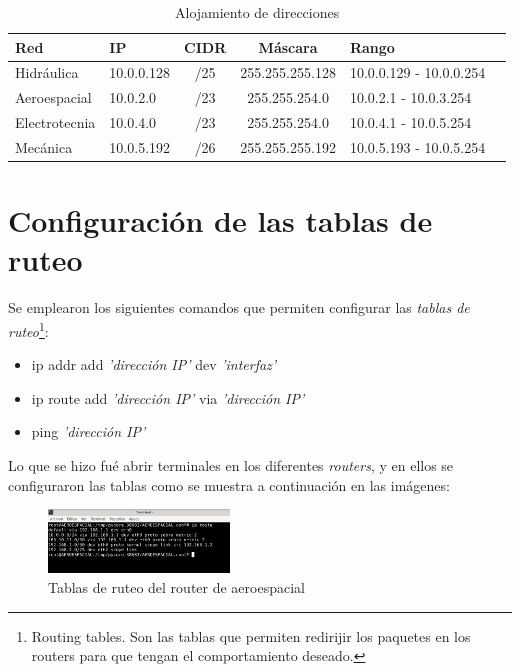 \documentclass[letterpaper, 10 pt, conference]{ieeeconf}  %
\begin{document}
\begin{table}[H]
	\centering
	\begin{tabular}{|l|l|c|c|l|l|}
		\hline
		\textbf{Red}  & \textbf{IP} & \textbf{CIDR} & \textbf{Máscara} & \textbf{Rango}          \\ \hline
		Hidráulica    & 10.0.0.128  & /25           & 255.255.255.128  & 10.0.0.129 - 10.0.0.254 \\ \hline
		Aeroespacial  & 10.0.2.0    & /23           & 255.255.254.0    & 10.0.2.1 - 10.0.3.254   \\ \hline
		Electrotecnia & 10.0.4.0    & /23           & 255.255.254.0    & 10.0.4.1 - 10.0.5.254   \\ \hline
		Mecánica      & 10.0.5.192  & /26           & 255.255.255.192  & 10.0.5.193 - 10.0.5.254 \\ \hline
	\end{tabular}
	\caption{Alojamiento de direcciones}
	\label{tab:subnet_allocation}
\end{table}

\section{Configuración de las tablas de ruteo}

Se emplearon los siguientes comandos que permiten configurar las \textit{tablas de ruteo}\footnote{Routing tables. Son las tablas que permiten redirijir los paquetes en los routers para que tengan el comportamiento deseado.}:

\begin{itemize}
	\item ip addr add \textit{'dirección IP'} dev \textit{'interfaz'}
	\item ip route add \textit{'dirección IP'} via \textit{'dirección IP'}
	\item ping \textit{'dirección IP'}
\end{itemize}

Lo que se hizo fué abrir terminales en los diferentes \textit{routers}, y en ellos se configuraron las tablas como se muestra a continuación en las imágenes:

\begin{figure}[H]
	\centering
	\includegraphics[width=0.43\textwidth]{./Imagenes/table1_AERO.png}
	\caption{Tablas de ruteo del router de aeroespacial}
	\label{fig:table_aero1}
\end{figure}
\end{document}
